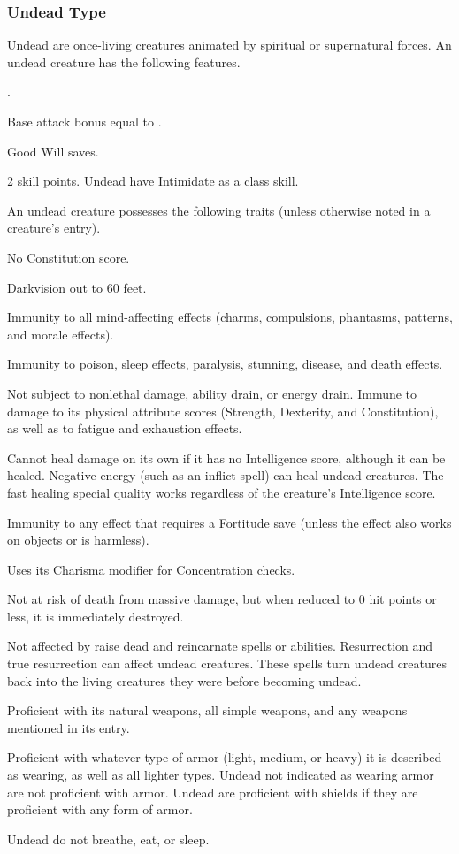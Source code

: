{\subsubsection{Undead Type} Undead are once-living creatures animated by spiritual or supernatural forces.
 An undead creature has the following features.
\begin{itemize*}
\item {}.
\item Base attack bonus equal to .
\item Good Will saves.
\item 2 skill points. Undead have Intimidate as a class skill.
\end{itemize*}
 An undead creature possesses the following traits (unless otherwise noted in a creature's entry).
\begin{itemize*}
\item No Constitution score.
\item Darkvision out to 60 feet.
\item Immunity to all mind-affecting effects (charms, compulsions, phantasms, patterns, and morale effects).
\item Immunity to poison, sleep effects, paralysis, stunning, disease, and death effects.
\item Not subject to nonlethal damage, ability drain, or energy drain. Immune to damage to its physical attribute scores (Strength, Dexterity, and Constitution), as well as to fatigue and exhaustion effects.
\item Cannot heal damage on its own if it has no Intelligence score, although it can be healed. Negative energy (such as an inflict spell) can heal undead creatures. The fast healing special quality works regardless of the creature's Intelligence score.
\item Immunity to any effect that requires a Fortitude save (unless the effect also works on objects or is harmless).
\item Uses its Charisma modifier for Concentration checks.
\item Not at risk of death from massive damage, but when reduced to 0 hit points or less, it is immediately destroyed.
\item Not affected by raise dead and reincarnate spells or abilities. Resurrection and true resurrection can affect undead creatures. These spells turn undead creatures back into the living creatures they were before becoming undead.
\item Proficient with its natural weapons, all simple weapons, and any weapons mentioned in its entry.
\item Proficient with whatever type of armor (light, medium, or heavy) it is described as wearing, as well as all lighter types. Undead not indicated as wearing armor are not proficient with armor. Undead are proficient with shields if they are proficient with any form of armor.
\item Undead do not breathe, eat, or sleep.
\end{itemize*}

}
